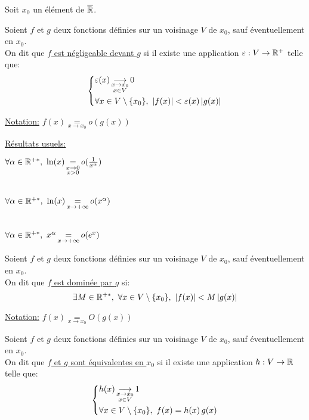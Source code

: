 \documentclass[12pt,twoside,a4paper]{article}
\author{MPSI 2}
\begin{document}
	\maketitle
	Soit $x_0$ un \'el\'ement de $\overline{\mathbb{R}}$.
	\begin{defi}
		Soient $f$ et $g$ deux fonctions d\'efinies sur un voisinage $V$ de $x_0$, sauf \'eventuellement en $x_0$.\\
		On dit que \underline{$f$ est n\'egligeable devant $g$} si il existe une application $\varepsilon:V\rightarrow\mathbb{R}^+$ telle que:
		$$\systeme{& \varepsilon(x)\mathop{\longrightarrow}\limits_{\substack{x\rightarrow x_0\\x\in V}}0\\&\forall x\in V\setminus \{x_0\},\ |f(x)|<\varepsilon(x)\,|g(x)| }$$
	\end{defi}
	\begin{flushleft}
		\underline{Notation:} $f(x)\mathop{=}\limits_{x\rightarrow x_0} o(g(x))$
	\end{flushleft}
	\begin{flushleft}
		\underline{R\'esultats usuels:}
		\begin{liste}
			\item $\forall \alpha\in\R^{+*},\ \ln(x)\mathop{=}\limits_{\substack{x\rightarrow 0\\x>0}}o(\frac1{x^\alpha})$\\\ \\
			\item $\forall \alpha\in\R^{+*},\ \ln(x)\mathop{=}\limits_{x\rightarrow +\infty} o(x^\alpha)$\\\ \\
			\item $\forall \alpha\in\R^{+*},\ x^\alpha\mathop{=}\limits_{x\rightarrow +\infty} o(e^x)$
		\end{liste}
	\end{flushleft}
	\begin{defi}
		Soient $f$ et $g$ deux fonctions d\'efinies sur un voisinage $V$ de $x_0$, sauf \'eventuellement en $x_0$.\\
		On dit que \underline{$f$ est domin\'ee par $g$} si:
		$$\exists M\in\mathbb{R}^{+*},\ \forall x\in V\setminus \{x_0\},\ |f(x)|<M\,|g(x)|$$
	\end{defi}
	\begin{flushleft}
		\underline{Notation:} $f(x)\mathop{=}\limits_{x\rightarrow x_0} O(g(x))$
	\end{flushleft}
	\begin{defi}
		Soient $f$ et $g$ deux fonctions d\'efinies sur un voisinage $V$ de $x_0$, sauf \'eventuellement en $x_0$.\\
		On dit que \underline{$f$ et $g$ sont \'equivalentes en $x_0$} si il existe une application $h:V\rightarrow\mathbb{R}$ telle que:
		$$\left\{\begin{aligned}& h(x)\mathop{\longrightarrow}\limits_{\substack{x\rightarrow x_0\\x\in V}}1\\&\forall x\in V\setminus \{x_0\},\ f(x)=h(x)\,g(x) \end{aligned}\right.$$
	\end{defi}
\end{document}
